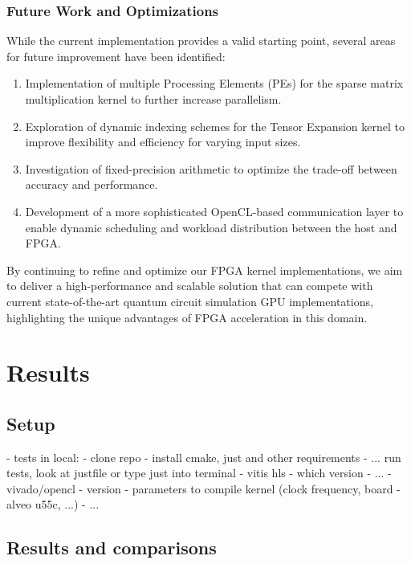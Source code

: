 \documentclass[12pt,oneside,a4paper]{article}
\begin{document}
\subsubsection{Future Work and Optimizations}

While the current implementation provides a valid starting point, several areas for future improvement have been identified:

\begin{enumerate}
    \item Implementation of multiple Processing Elements (PEs) for the sparse matrix multiplication kernel to further increase parallelism.
    \item Exploration of dynamic indexing schemes for the Tensor Expansion kernel to improve flexibility and efficiency for varying input sizes.
    \item Investigation of fixed-precision arithmetic to optimize the trade-off between accuracy and performance.
    \item Development of a more sophisticated OpenCL-based communication layer to enable dynamic scheduling and workload distribution between the host and FPGA.
\end{enumerate}

By continuing to refine and optimize our FPGA kernel implementations, we aim to deliver a high-performance and scalable solution that can compete with current state-of-the-art quantum circuit simulation GPU implementations, highlighting the unique advantages of FPGA acceleration in this domain.


\section{Results}
\label{sec:results}

\subsection{Setup}
- tests in local:
	- clone repo
	- install cmake, just and other requirements
	- ... run tests, look at justfile or type just into terminal
- vitis hls
	- which version
	- ...
- vivado/opencl
	- version
	- parameters to compile kernel (clock frequency, board - alveo u55c, ...)
	- ...

\subsection{Results and comparisons}
\end{document}
